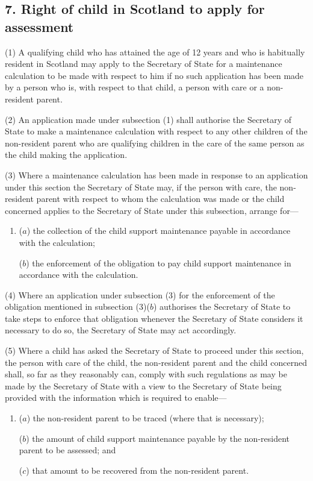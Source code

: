 \documentclass[a4paper]{article}
\begin{document}
\subsection{7. Right of child in Scotland to apply for assessment}

(1) A qualifying child who has attained the age of 12 years and who is habitually
resident in Scotland may apply to the Secretary of State for a maintenance calculation to be made with respect to him if
no such application has been made by a person who is, with respect to that
child, a person with care or a non-resident parent.

(2)
An application made under subsection (1) shall authorise the 
Secretary of
State to make a maintenance calculation
with respect to
any other children of the non-resident parent
who are qualifying
children in the care of the same person as the child making the application.

(3)
Where a maintenance calculation
has been made in
response to an application under this section the Secretary of State may, if the
person with care, the non-resident parent
with respect to whom the
calculation
was made or the child concerned applies to 
the Secretary
of State under this subsection, arrange for---
\begin{enumerate}\item[]
($a$)
the collection of the child support maintenance payable in accordance
with the calculation;

($b$)
the enforcement of the obligation to pay child support maintenance in
accordance with the calculation.
\end{enumerate}
	
(4)
Where an application under subsection (3) for the enforcement of the
obligation mentioned in subsection (3)($b$) authorises the Secretary of State to take
steps to enforce that obligation whenever the Secretary of State considers it
necessary to do so, the Secretary of State may act accordingly.

(5)
Where a child has asked the Secretary of State to proceed under this section,
the person with care of the child, the non-resident parent
and the
child concerned shall, so far as they reasonably can, comply with such regulations as
may be made by the Secretary of State with a view to the Secretary of State being provided with the information which is required to enable---
\begin{enumerate}\item[]
($a$)
the non-resident parent
to be traced (where that is necessary);

($b$)
the amount of child support maintenance payable by the non-resident parent
to be assessed; and

($c$)
that amount to be recovered from the non-resident parent.
\end{enumerate}
\end{document}
